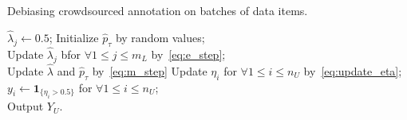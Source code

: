 \incmargin{1em}
\begin{algorithm}[!t]
       \caption{Debiasing crowdsourced annotation on batches of data items.}\label{alg:debias}
\small

       \BlankLine
       $\hat{\lambda}_j \leftarrow 0.5$;
       Initialize $\hat{p}_{\tau}$ by random values; \\
       {
           Update $\hat{\lambda}_j$ bfor $\forall 1 \leq j \leq m_L$ by~\eqref{eq:e_step}; \\
           Update $\hat{\lambda}$ and $\hat{p}_{\tau}$ by~\eqref{eq:m_step}
       }
       \BlankLine
       {
           Update $\eta_i$ for $\forall 1 \leq i \leq n_U$ by~\eqref{eq:update_eta};
       }
       $y_i \leftarrow \mathbf{1}_{\{\eta_i > 0.5\}}$ for $\forall 1 \leq i \leq n_U$; \\
       Output $Y_U$.
\end{algorithm}
\normalsize
\decmargin{1em}



